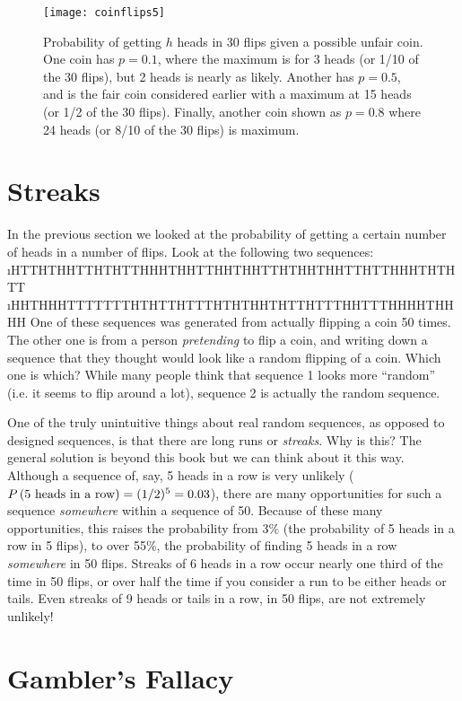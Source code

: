 \begin{figure}
\texttt{[image: coinflips5]}
\label{fig:coinflips5}
\caption{Probability of getting $h$ heads in 30 flips given a possible unfair coin. One coin has $p=0.1$, where the maximum is for 3 heads (or 1/10 of the 30 flips), but 2 heads is nearly as likely.  Another has $p=0.5$, and is the fair coin considered earlier with a maximum at 15 heads (or 1/2 of the 30 flips).  Finally, another coin shown as $p=0.8$ where 24 heads (or 8/10 of the 30 flips) is maximum. }
\end{figure}




\section{Streaks}

In the previous section we looked at the probability of getting a certain number of heads in a number of flips.  Look at the following two sequences:
\be
\i HTTHTHHTTHTHTTHHHTHHTTHHTHHTTHTHHTHHTTHTTHHHTHTHTT
\i HHTHHHTTTTTTTHTHTTHTTTHTHTHHTHTTHTTTHHTTTHHHHTHHHH
\ee
One of these sequences was generated from actually flipping a coin 50 times.  The other one is from a person {\em pretending} to flip a coin, and writing down a sequence that they thought would look like a random flipping of a coin.  Which one is which?  While many people think that sequence 1 looks more ``random'' (i.e. it seems to flip around a lot), sequence 2 is actually the random sequence.  

One of the truly unintuitive things about real random sequences, as opposed to designed sequences, is that there are long runs or {\em streaks}.  Why is this?  The general solution is beyond this book but we can think about it this way.  Although a sequence of, say, 5 heads in a row is very unlikely ($\P{5 heads in a row}=(1/2)^{5}=0.03$), there are many opportunities for such a sequence {\em somewhere} within a sequence of 50.  Because of these many opportunities, this raises the probability from 3\% (the probability of 5 heads in a row in 5 flips), to over 55\%, the probability of finding 5 heads in a row {\em somewhere} in 50 flips.  Streaks of 6 heads in a row occur nearly one third of the time in 50 flips, or over half the time if you consider a run to be either heads or tails.  Even streaks of 9 heads or tails in a row, in 50 flips, are not extremely unlikely!
\section{Gambler's Fallacy}

